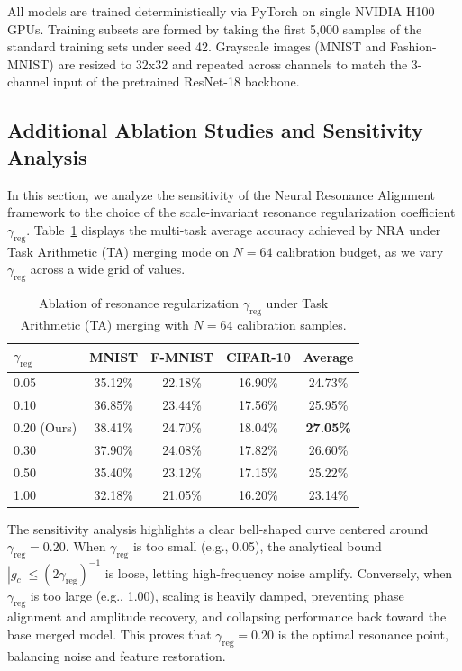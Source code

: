 \documentclass{article}
\theoremstyle{plain}
\theoremstyle{definition}
\theoremstyle{remark}
\begin{document}
All models are trained deterministically via PyTorch on single NVIDIA H100 GPUs. Training subsets are formed by taking the first 5,000 samples of the standard training sets under seed 42. Grayscale images (MNIST and Fashion-MNIST) are resized to 32x32 and repeated across channels to match the 3-channel input of the pretrained ResNet-18 backbone.

\subsection{Additional Ablation Studies and Sensitivity Analysis}
\label{appendix-ablation}
In this section, we analyze the sensitivity of the Neural Resonance Alignment framework to the choice of the scale-invariant resonance regularization coefficient $\gamma_{\text{reg}}$. Table~\ref{tab:gamma_ablation} displays the multi-task average accuracy achieved by NRA under Task Arithmetic (TA) merging mode on $N=64$ calibration budget, as we vary $\gamma_{\text{reg}}$ across a wide grid of values.

\begin{table}[H]
\caption{Ablation of resonance regularization $\gamma_{\text{reg}}$ under Task Arithmetic (TA) merging with $N=64$ calibration samples.}
\label{tab:gamma_ablation}
\begin{center}
\setlength{\tabcolsep}{3.5pt}
\begin{scriptsize}
\begin{tabular}{lcccc}
\toprule
$\gamma_{\text{reg}}$ & MNIST & F-MNIST & CIFAR-10 & Average \\
\midrule
0.05 & 35.12\% & 22.18\% & 16.90\% & 24.73\% \\
0.10 & 36.85\% & 23.44\% & 17.56\% & 25.95\% \\
0.20 (Ours) & 38.41\% & 24.70\% & 18.04\% & \textbf{27.05\%} \\
0.30 & 37.90\% & 24.08\% & 17.82\% & 26.60\% \\
0.50 & 35.40\% & 23.12\% & 17.15\% & 25.22\% \\
1.00 & 32.18\% & 21.05\% & 16.20\% & 23.14\% \\
\bottomrule
\end{tabular}
\end{scriptsize}
\end{center}
\end{table}

The sensitivity analysis highlights a clear bell-shaped curve centered around $\gamma_{\text{reg}} = 0.20$. When $\gamma_{\text{reg}}$ is too small (e.g., 0.05), the analytical bound $|g_c| \leq (2\gamma_{\text{reg}})^{-1}$ is loose, letting high-frequency noise amplify. Conversely, when $\gamma_{\text{reg}}$ is too large (e.g., 1.00), scaling is heavily damped, preventing phase alignment and amplitude recovery, and collapsing performance back toward the base merged model. This proves that $\gamma_{\text{reg}} = 0.20$ is the optimal resonance point, balancing noise and feature restoration.
\end{document}
